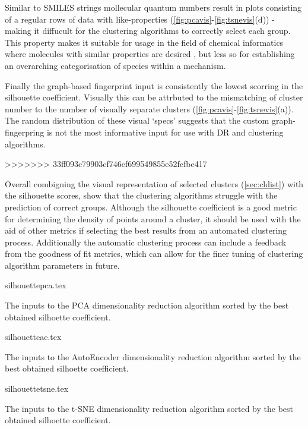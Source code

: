 Similar to SMILES strings mollecular quantum numbers result in plots consisting of a regular rows of data with like-properties (\autoref{fig:pcavis}-\ref{fig:tsnevis}(d)) - making it diffucult for the clustering algorithms to correctly select each group. This property makes it suitable for usage in the field of chemical informatics where molecules with similar properties are desired \citep{mqnpca}, but less so for establishing an overarching categorisation of species within a mechanism.

Finally the graph-based fingerprint input is consistently the lowest scorring in the silhouette coefficient. Visually this can be attrbuted to the mismatching of cluster number to the number of visually separate clusters  (\autoref{fig:pcavis}-\ref{fig:tsnevis}(a)). The random distribution of these visual `specs' suggests that the custom graph-fingerpring is not the most informative input for use with DR and clustering algorithms.

>>>>>>> 33ff093c79903cf746ef699549855e52fcfbe417

Overall combigning the visual representation of selected clusters (\autoref{sec:cldist}) with the silhouette scores, show that the clustering algorithms struggle with the prediction of correct groups. Although the silhouette coefficient is a good metric for determining the density of points around a cluster, it should be used with the aid of other metrics if selecting the best results from an automated clustering process. Additionally the automatic clustering process can include a feedback from the goodness of fit metrics, which can allow for the finer tuning of clustering algorithm parameters in future.


\begin{table}[H]
    \centering
        {silhouettepca.tex}
        \caption{The inputs to the PCA dimensionality reduction algorithm sorted by the best obtained silhoette coefficient.  }
        \label{tab:pcasil}
\end{table}


\begin{table}[H]
    \centering
        {silhouetteae.tex}
        \caption{The inputs to the AutoEncoder dimensionality reduction algorithm sorted by the best obtained silhoette coefficient.  }
        \label{tab:aesil}
\end{table}

\begin{table}[H]
    \centering
        {silhouettetsne.tex}
        \caption{The inputs to the t-SNE dimensionality reduction algorithm sorted by the best obtained silhoette coefficient.  }
        \label{tab:tsnesil}
\end{table}










